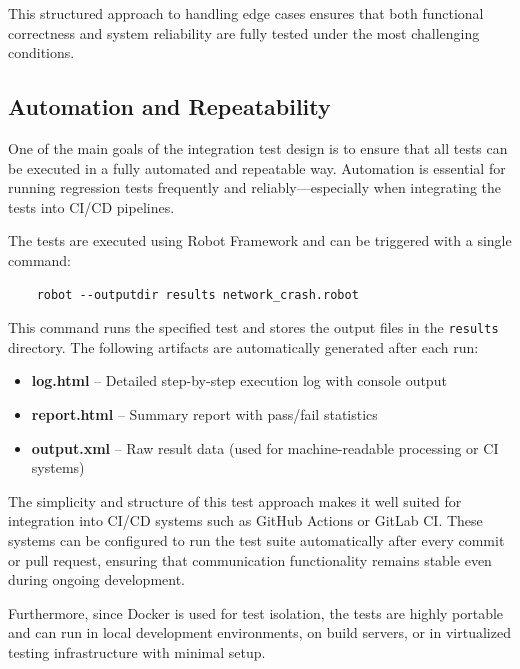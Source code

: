 This structured approach to handling edge cases ensures that both functional correctness and system reliability are fully tested under the most challenging conditions.


\subsection{Automation and Repeatability}

One of the main goals of the integration test design is to ensure that all tests can be executed in a fully automated and repeatable way. Automation is essential for running regression tests frequently and reliably—especially when integrating the tests into CI/CD pipelines.

\vspace{0.9em}
The tests are executed using Robot Framework and can be triggered with a single command:

\begin{verbatim}
	robot --outputdir results network_crash.robot
\end{verbatim}

\vspace{0.5em}
This command runs the specified test and stores the output files in the \texttt{results} directory. The following artifacts are automatically generated after each run:

\begin{itemize}
	\item \textbf{log.html} – Detailed step-by-step execution log with console output
	\item \textbf{report.html} – Summary report with pass/fail statistics
	\item \textbf{output.xml} – Raw result data (used for machine-readable processing or CI systems)
\end{itemize}

\vspace{0.5em}
The simplicity and structure of this test approach makes it well suited for integration into CI/CD systems such as GitHub Actions or GitLab CI. These systems can be configured to run the test suite automatically after every commit or pull request, ensuring that communication functionality remains stable even during ongoing development.

\vspace{0.9em}
Furthermore, since Docker is used for test isolation, the tests are highly portable and can run in local development environments, on build servers, or in virtualized testing infrastructure with minimal setup.

